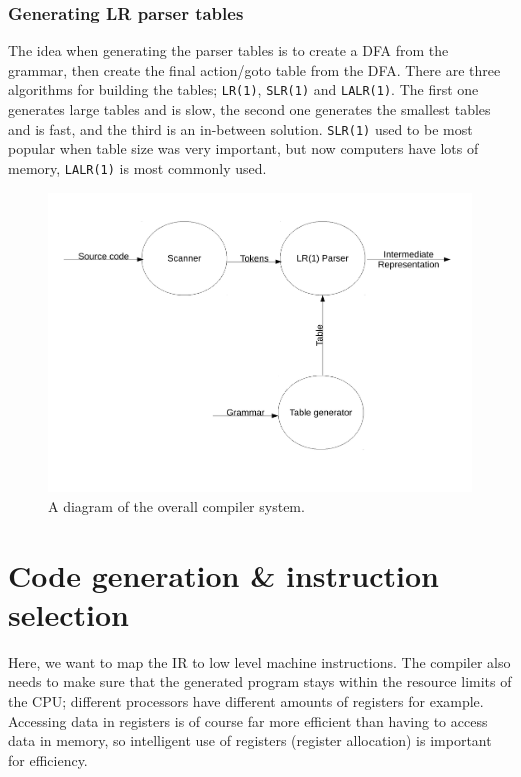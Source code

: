 \subsubsection{Generating LR parser tables}

The idea when generating the parser tables is to create a DFA from the grammar,
then create the final action/goto table from the DFA. There are three algorithms
for building the tables; \texttt{LR(1)}, \texttt{SLR(1)} and \texttt{LALR(1)}.
The first one generates large tables and is slow, the second one generates the
smallest tables and is fast, and the third is an in-between solution.
\texttt{SLR(1)} used to be most popular when table size was very important, but
now computers have lots of memory, \texttt{LALR(1)} is most commonly used.


\begin{figure}
  \includegraphics[width=\textwidth]{diagrams/big-picture-1}
  \caption{A diagram of the overall compiler system.}
\end{figure}


\section{Code generation \& instruction selection}

Here, we want to map the IR to low level machine instructions. The
compiler also needs to make sure that the generated program stays
within the resource limits of the CPU; different processors have
different amounts of registers for example. Accessing data in
registers is of course far more efficient than having to access data
in memory, so intelligent use of registers (register allocation) is
important for efficiency.

